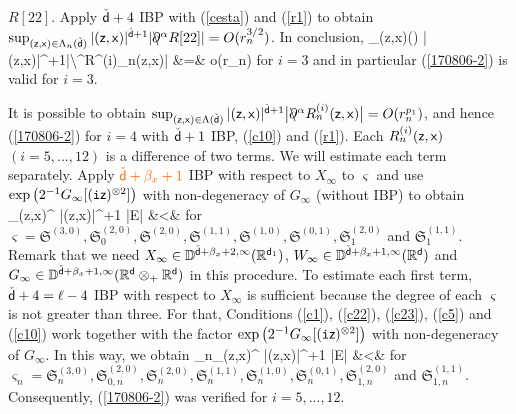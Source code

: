 \documentclass[a4paper]{article}
\newcommand{\colred}{\color[rgb]{0.8,0,0}}
\newcommand{\coloro}{\color[rgb]{1,0.4,0}}%
\newcommand{\colred}{\color{black}}%
\newcommand{\coloro}{\color{black}}%
\numberwithin{equation}{section}
\def\csfd{{\check{\sfd}}}
\def\tti{{\tt i}}
\newcommand{\sfx}{{\sf x}}
\newcommand{\sfz}{{\sf z}}
\def\sfd{{\sf d}}
\def\partialbs{\backslash\!\!\!\partial}
\begin{document}
{\im $R[22]$. Apply $\csfd+4$ IBP with (\ref{cesta}) and (\ref{r1}) to obtain 
$\sup_{(\sfz,\sfx)\in\Lambda_n(\csfd)}|(\sfz,\sfx)|^{\csfd+1}|\partialbs^\alpha R[22]|=O(r_n^{3/2})$. 
\ei
In conclusion, 
\bea\label{17-811-21}
\sup_{(\sfz,\sfx)\in\Lambda(\csfd)}
|(\sfz,\sfx)|^{\csfd+1}\big|\partialbs^\alpha R^{(i)}_n(\sfz,\sfx)\big|
&=& 
o(r_n)
\eea
for $i=3$
and in particular (\ref{170806-2}) is valid for $i=3$. 

It is possible to obtain 
$\sup_{(\sfz,\sfx)\in\Lambda(\csfd)}
|(\sfz,\sfx)|^{\csfd+1}\big|\partialbs^\alpha R^{(i)}_n(\sfz,\sfx)\big|=O(r_n^{p_1})$, 
and hence 
(\ref{170806-2}) for $i=4$ with $\csfd+1$ IBP, (\ref{c10}) and (\ref{r1}). 
Each $R^{(i)}_n(\sfz,\sfx)$ $(i=5,...,12)$ is a difference of two terms. 
We will estimate each term separately. 
Apply ${\coloro \csfd+\beta_x+1}$ IBP with respect to $X_\infty$ 
to $\varsigma$ and use $\exp\big(2^{-1}G_\infty[(\tti\sfz)^{\otimes2}]\big)$ 
with non-degeneracy of $G_\infty$ (without IBP) 
to obtain 
\beas 
\sup_{(\sfz,\sfx)\in\bbR^{\csfd}}
|(\sfz,\sfx)|^{\csfd+1}
\big|E\big[\Psi(\sfz,\sfx){\mathfrak \varsigma}({\colred\tti}\sfz,{\colred\tti}\sfx)]\big|
&<&
\infty
\eeas
for $\varsigma={\mathfrak S}^{(3,0)}, {\mathfrak S}_{0}^{(2,0)}, 
{\mathfrak S}^{(2,0)}, {\mathfrak S}^{(1,1)}, {\mathfrak S}^{(1,0)}, {\mathfrak S}^{(0,1)}, 
{\mathfrak S}_{1}^{(2,0)}$ and ${\mathfrak S}_{1}^{(1,1)}$. 
Remark that we need 
$X_\infty\in\bbD^{\csfd+\beta_x+2,\infty}(\bbR^{\sfd_1})$, 
$W_\infty\in\bbD^{\csfd+\beta_x+1,\infty}(\bbR^\sfd)$ and 
$G_\infty\in\bbD^{\csfd+\beta_x+1,\infty}(\bbR^\sfd\otimes_+\bbR^\sfd)$ 
in this procedure. 
To estimate each first term, 
$\csfd+4=\ell-4$ IBP with respect to $X_\infty$ 
is sufficient because the degree of each $\varsigma$ is not greater than three. 
For that, Conditions (\ref{c1}), (\ref{c22}), (\ref{c23}), (\ref{c5}) and (\ref{c10}) work 
together with the factor $\exp\big(2^{-1}G_\infty[(\tti\sfz)^{\otimes2}]\big)$ 
with non-degeneracy of $G_\infty$. 
In this way, we obtain 
\beas 
\sup_n\sup_{(\sfz,\sfx)\in\bbR^{\csfd}}
|(\sfz,\sfx)|^{\csfd+1}
\big|E\big[\Psi(\sfz,\sfx)\varsigma_n({\colred\tti}\sfz,{\colred\tti}\sfx)]\big|
&<&
\infty
\eeas
for $\varsigma_n={\mathfrak S}_n^{(3,0)}, {\mathfrak S}_{0,n}^{(2,0)}, 
{\mathfrak S}_n^{(2,0)}, {\mathfrak S}_n^{(1,1)}, {\mathfrak S}_n^{(1,0)}, {\mathfrak S}_n^{(0,1)}, 
{\mathfrak S}_{1,n}^{(2,0)}$ and ${\mathfrak S}_{1,n}^{(1,1)}$. 
Consequently, (\ref{170806-2}) was verified for $i=5,...,12$. 

}
\end{document}
